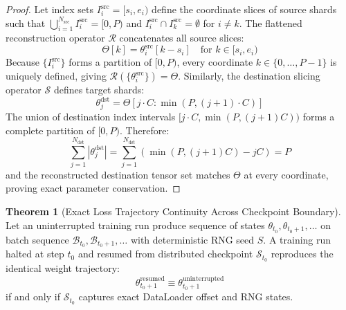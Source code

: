 \documentclass[11pt,a4paper]{article}
\theoremstyle{definition}
\newtheorem{theorem}{\textbf{Theorem}}[section]
\begin{document}
\begin{proof}
Let index sets $I_i^{\text{src}} = [s_i, e_i)$ define the coordinate slices of source shards such that $\bigcup_{i=1}^{N_{\text{src}}} I_i^{\text{src}} = [0, P)$ and $I_i^{\text{src}} \cap I_k^{\text{src}} = \emptyset$ for $i \neq k$.
The flattened reconstruction operator $\mathcal{R}$ concatenates all source slices:
{\boldmath
\begin{equation}
\Theta[k] = \theta_i^{\text{src}}[k - s_i] \quad \text{for } k \in [s_i, e_i)
\end{equation}
}
Because $\{I_i^{\text{src}}\}$ forms a partition of $[0, P)$, every coordinate $k \in \{0, \dots, P-1\}$ is uniquely defined, giving $\mathcal{R}(\{\theta_i^{\text{src}}\}) = \Theta$.
Similarly, the destination slicing operator $\mathcal{S}$ defines target shards:
{\boldmath
\begin{equation}
\theta_j^{\text{dst}} = \Theta[j \cdot C : \min(P, (j+1) \cdot C)]
\end{equation}
}
The union of destination index intervals $[j \cdot C, \min(P, (j+1)C))$ forms a complete partition of $[0, P)$.
Therefore:
{\boldmath
\begin{equation}
\sum_{j=1}^{N_{\text{dst}}} |\theta_j^{\text{dst}}| = \sum_{j=1}^{N_{\text{dst}}} (\min(P, (j+1)C) - j C) = P
\end{equation}
}
and the reconstructed destination tensor set matches $\Theta$ at every coordinate, proving exact parameter conservation.
\end{proof}

\begin{theorem}[Exact Loss Trajectory Continuity Across Checkpoint Boundary]
Let an uninterrupted training run produce sequence of states $\theta_{t_0}, \theta_{t_0+1}, \dots$ on batch sequence $\mathcal{B}_{t_0}, \mathcal{B}_{t_0+1}, \dots$ with deterministic RNG seed $S$. A training run halted at step $t_0$ and resumed from distributed checkpoint $\mathcal{S}_{t_0}$ reproduces the identical weight trajectory:
{\boldmath
\begin{equation}
\theta_{t_0+1}^{\text{resumed}} \equiv \theta_{t_0+1}^{\text{uninterrupted}}
\end{equation}
}
if and only if $\mathcal{S}_{t_0}$ captures exact DataLoader offset and RNG states.
\end{theorem}
\end{document}
